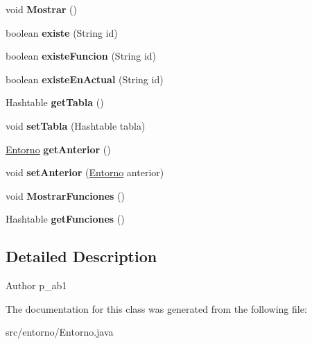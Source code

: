 \begin{DoxyCompactItemize}
\item 
\mbox{\label{classentorno_1_1_entorno_a706feef9251a7f4bac0a72a401b358bb}} 
void {\bfseries Mostrar} ()
\item 
\mbox{\label{classentorno_1_1_entorno_af5def864db6d045fbc2df78d810985ff}} 
boolean {\bfseries existe} (String id)
\item 
\mbox{\label{classentorno_1_1_entorno_adf774e0bfcc00081aa03a8d4acd03421}} 
boolean {\bfseries existe\+Funcion} (String id)
\item 
\mbox{\label{classentorno_1_1_entorno_ad190dca46a47bf719b8b0a39bf684188}} 
boolean {\bfseries existe\+En\+Actual} (String id)
\item 
\mbox{\label{classentorno_1_1_entorno_a7053d407b670dce82e1b5579e3b79c98}} 
Hashtable {\bfseries get\+Tabla} ()
\item 
\mbox{\label{classentorno_1_1_entorno_a3b2f7f0ba287916fd68b7c85e60a9d8d}} 
void {\bfseries set\+Tabla} (Hashtable tabla)
\item 
\mbox{\label{classentorno_1_1_entorno_a9d6c3e60aa6db7f0daef65b200eb2b10}} 
\mbox{\hyperlink{classentorno_1_1_entorno}{Entorno}} {\bfseries get\+Anterior} ()
\item 
\mbox{\label{classentorno_1_1_entorno_a5ffd51f75210a71b1b7e38d37625a1c1}} 
void {\bfseries set\+Anterior} (\mbox{\hyperlink{classentorno_1_1_entorno}{Entorno}} anterior)
\item 
\mbox{\label{classentorno_1_1_entorno_a00229948ef8e3b50341a46fc76be2aa6}} 
void {\bfseries Mostrar\+Funciones} ()
\item 
\mbox{\label{classentorno_1_1_entorno_a09ac19c76b5c3a9bfddfade4624c920a}} 
Hashtable {\bfseries get\+Funciones} ()
\end{DoxyCompactItemize}


\subsection{Detailed Description}
\begin{DoxyAuthor}{Author}
p\+\_\+ab1 
\end{DoxyAuthor}


The documentation for this class was generated from the following file\+:\begin{DoxyCompactItemize}
\item 
src/entorno/Entorno.\+java\end{DoxyCompactItemize}
